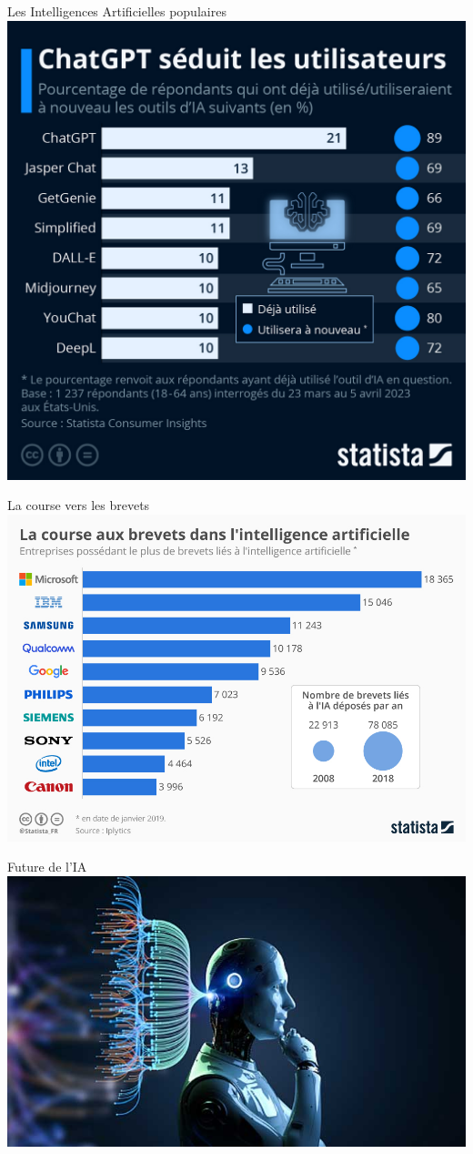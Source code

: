 \documentclass{beamer}
\begin{document}
\begin{frame}{Les Intelligences Artificielles populaires }
	\centering
	\includegraphics[width=0.6\linewidth]{PopularAI.jpeg}
\end{frame}


\begin{frame}{La course vers les brevets}
	\centering
	\includegraphics[width=\linewidth]{BrevetIA.jpeg}
\end{frame}


\begin{frame}{Future de l'IA}
	\centering
	\includegraphics[width=\linewidth]{Fut.jpg}
\end{frame}
\end{document}
